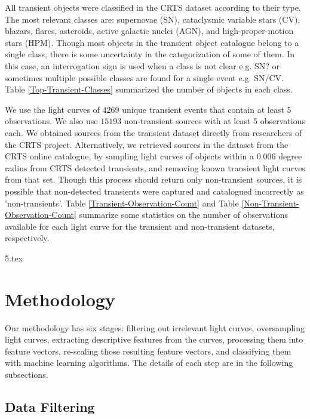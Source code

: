 \documentclass[a4paper,fleqn,usenatbib]{mnras}
\begin{document}
All transient objects were classified in the CRTS dataset according to
their type. 
The most relevant classes are: supernovae (SN),
cataclysmic variable stars (CV), blazars, flares, asteroids, active
galactic nuclei (AGN), and high-proper-motion stars (HPM). 
Though most objects in the transient object catalogue belong to a single class,
there is some uncertainty in the categorization of some of
them. 
In this case, an interrogation sign is used when a class is not clear
e.g. SN? or sometimes multiple possible classes are found for a single
event e.g. SN/CV.
Table \ref{Top-Transient-Classes} summarized the number of objects in each class.


We use the light curves of $4269$ unique transient events that
contain at least 5 observations.
We also use $15193$ non-transient sources with at least 5 observations each. 
We obtained sources from the transient dataset directly from researchers of the CRTS project. Alternatively, we retrieved sources in the dataset from the
CRTS online catalogue, by sampling light curves of objects within a 0.006 
degree radius from CRTS detected transients, and removing known transient 
light curves from that set. 
Though this process should return only non-transient sources, it is
possible that non-detected transients were captured and catalogued
incorrectly as 'non-transients'.  
Table \ref{Transient-Observation-Count} and
Table \ref{Non-Transient-Observation-Count} summarize some statistics
on the number of observations available for each light curve for the
transient and non-transient datasets, respectively.  



{5.tex}


\section{Methodology} \label{section_method}

Our methodology has six stages: 
filtering out irrelevant light curves, oversampling light curves, extracting
descriptive features from the curves, processing them into feature
vectors, re-scaling those resulting feature vectors, and 
classifying them with machine learning algorithms. 
The details of each step are in the following subsections.

\subsection{Data Filtering} \label{subsection_filtering}
\end{document}
